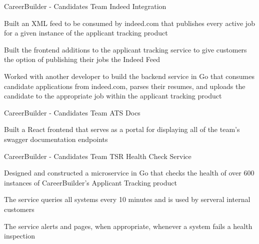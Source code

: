 
\begin{cventries}

\cventry
{CareerBuilder - Candidates Team} %
{Indeed Integration} %
{} %
{} %
{
	\begin{cvitems} %
		\item {Built an XML feed to be consumed by indeed.com that publishes every active job for a given instance of the applicant tracking product}  
		\item {Built the frontend additions to the applicant tracking service to give customers the option of publishing their jobs the Indeed Feed}
		\item {Worked with another developer to build the backend service in Go that consumes candidate applications from indeed.com, parses their resumes, and uploads the candidate to the appropriate job within the applicant tracking product} 
	\end{cvitems}
}

\cventry
 {CareerBuilder - Candidates Team} %
    {ATS Docs} %
    {} %
    {} %
    {
      \begin{cvitems} %
        \item {Built a React frontend that serves as a portal for displaying all of the team's swagger documentation endpoints}
      \end{cvitems}
    }

\cventry
  	{CareerBuilder - Candidates Team} %
    {TSR Health Check Service} %
    {} %
    {} %
    {
      \begin{cvitems} %
        \item {Designed and constructed a microservice in Go that checks the health of over 600 instances of CareerBuilder's Applicant Tracking product}  
        \item {The service queries all systems every 10 minutes and is used by serveral internal customers}
        \item {The service alerts and pages, when appropriate, whenever a system fails a health inspection} 
      \end{cvitems}
    }



\end{cventries}
